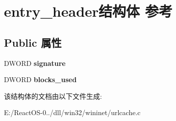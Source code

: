 \hypertarget{structentry__header}{}\section{entry\+\_\+header结构体 参考}
\label{structentry__header}
\subsection*{Public 属性}
\begin{DoxyCompactItemize}
\item 
\mbox{\label{structentry__header_aad76763ab051a2a930a191c12c3cddf1}} 
D\+W\+O\+RD {\bfseries signature}
\item 
\mbox{\label{structentry__header_a53366f563a1c4ba23ff6e5e25eb98e0b}} 
D\+W\+O\+RD {\bfseries blocks\+\_\+used}
\end{DoxyCompactItemize}


该结构体的文档由以下文件生成\+:\begin{DoxyCompactItemize}
\item 
E\+:/\+React\+O\+S-\/0../dll/win32/wininet/urlcache.\+c\end{DoxyCompactItemize}
